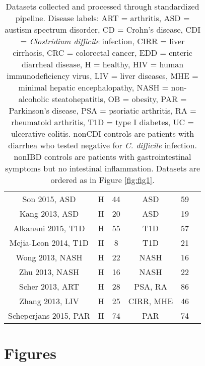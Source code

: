 {{\begin{table}[h]
{\begin{tabular}{c c c c c c}
	Son 2015, ASD & H & 44 & ASD & 59 & \cite{asd-son} \\
	Kang 2013, ASD & H & 20 & ASD & 19 & \cite{asd-kb} \\
	Alkanani 2015, T1D & H & 55 & T1D & 57 & \cite{t1d-alkanani} \\
	Mejia-Leon 2014, T1D & H & 8 & T1D & 21 & \cite{t1d-mejia} \\
	Wong 2013, NASH & H & 22 & NASH & 16 & \cite{nash-chan} \\
	Zhu 2013, NASH & H & 16 & NASH & 22 & \cite{nash-baker} \\
	Scher 2013, ART & H & 28 & PSA, RA & 86 & \cite{ra-littman} \\
	Zhang 2013, LIV & H & 25 & CIRR, MHE & 46 & \cite{mhe-zhang} \\
	Scheperjans 2015, PAR & H & 74 & PAR & 74 & \cite{par-schep} \\
	\hline
\end{tabular}}
\caption{Datasets collected and processed through standardized pipeline. Disease labels: ART = arthritis, ASD = austism spectrum disorder, CD = Crohn's disease, CDI = \textit{Clostridium difficile} infection, CIRR = liver cirrhosis, CRC = colorectal cancer, EDD = enteric diarrheal disease, H = healthy, HIV = human immunodeficiency virus, LIV = liver diseases,  MHE =  minimal hepatic encephalopathy, NASH = non-alcoholic steatohepatitis, OB = obesity, PAR = Parkinson's disease, PSA = psoriatic arthritis, RA = rheumatoid arthritis, T1D = type I diabetes, UC = ulcerative colitis. nonCDI controls are patients with diarrhea who tested negative for \textit{C. difficile} infection. nonIBD controls are patients  with gastrointestinal symptoms but no intestinal inflammation. Datasets are ordered as in Figure \ref{fig:fig1}.}\label{tab:datasets}
\end{table}
}

\section{Figures}

}
